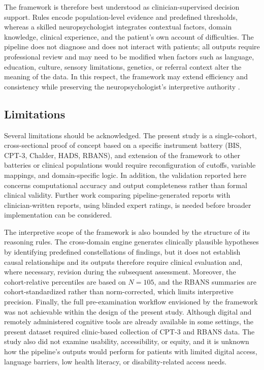 \documentclass[11pt,a4paper]{article}
\begin{document}
The framework is therefore best understood as clinician-supervised decision support. Rules encode population-level evidence and predefined thresholds, whereas a skilled neuropsychologist integrates contextual factors, domain knowledge, clinical experience, and the patient's own account of difficulties. The pipeline does not diagnose and does not interact with patients; all outputs require professional review and may need to be modified when factors such as language, education, culture, sensory limitations, genetics, or referral context alter the meaning of the data. In this respect, the framework may extend efficiency and consistency while preserving the neuropsychologist's interpretive authority \citep{LundervoldAJ2025}.

\subsection{Limitations}

Several limitations should be acknowledged. The present study is a single-cohort, cross-sectional proof of concept based on a specific instrument battery (BIS, CPT-3, Chalder, HADS, RBANS), and extension of the framework to other batteries or clinical populations would require reconfiguration of cutoffs, variable mappings, and domain-specific logic. In addition, the validation reported here concerns computational accuracy and output completeness rather than formal clinical validity. Further work comparing pipeline-generated reports with clinician-written reports, using blinded expert ratings, is needed before broader implementation can be considered.

The interpretive scope of the framework is also bounded by the structure of its reasoning rules. The cross-domain engine generates clinically plausible hypotheses by identifying predefined constellations of findings, but it does not establish causal relationships and its outputs therefore require clinical evaluation and, where necessary, revision during the subsequent assessment. Moreover, the cohort-relative percentiles are based on $N = 105$, and the RBANS summaries are cohort-standardized rather than norm-corrected, which limits interpretive precision. Finally, the full pre-examination workflow envisioned by the framework was not achievable within the design of the present study. Although digital and remotely administered cognitive tools are already available in some settings, the present dataset required clinic-based collection of CPT-3 and RBANS data. The study also did not examine usability, accessibility, or equity, and it is unknown how the pipeline's outputs would perform for patients with limited digital access, language barriers, low health literacy, or disability-related access needs.
\end{document}

